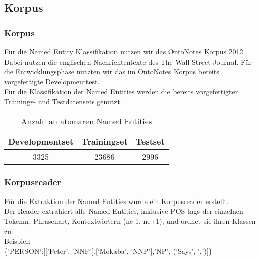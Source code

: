 \documentclass{beamer}
\begin{document}
	\subsection{Korpus}
	\begin{frame}
			\frametitle{Korpus}
			Für die Named Entity Klassifikation nutzen wir das OntoNotes Korpus 2012.\\
			
			Dabei nutzen die englischen Nachrichtentexte des The Wall Street Journal.
			Für die Entwicklungsphase nutzten wir das im OntoNotes Korpus bereits vorgefertigte Developmenttest.\\
			
			Für die Klassifikation der Named Entities werden die bereits vorgefertigten Trainings- und Testdatensets genutzt.\\
			 \begin{table}
			 	\caption{Anzahl an atomaren Named Entities}
			 	\begin{tabular}{ccc}
			 		\toprule
					Developmentset & Trainingset & Testset\\
			 		\midrule
					3325 & 23686 & 2996\\
			 		\bottomrule
			 	\end{tabular}
			 	\label{tab:datasets}
			 \end{table}
	\end{frame}
		\begin{frame}
			\frametitle{Korpusreader}
			Für die Extraktion der Named Entities wurde ein Korpusreader erstellt.\\
			Der Reader extrahiert alle Named Entities, inklusive POS-tags der einzelnen Tokenm, Phrasenart, Kontextwörtern (ne-1, ne+1), und ordnet sie ihren Klassen zu.\\
			
			Beispiel:\\
			\{'PERSON':[['Peter', 'NNP'],['Mokaba', 'NNP'],'NP', ('Says', ',')]\}
		\end{frame}
	
\end{document}

